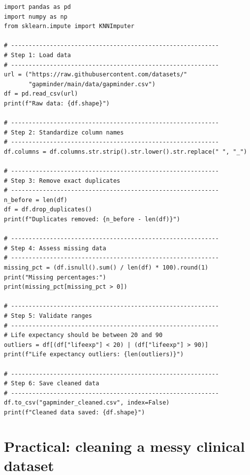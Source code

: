 \begin{verbatim}
import pandas as pd
import numpy as np
from sklearn.impute import KNNImputer

# -----------------------------------------------------------
# Step 1: Load data
# -----------------------------------------------------------
url = ("https://raw.githubusercontent.com/datasets/"
       "gapminder/main/data/gapminder.csv")
df = pd.read_csv(url)
print(f"Raw data: {df.shape}")

# -----------------------------------------------------------
# Step 2: Standardize column names
# -----------------------------------------------------------
df.columns = df.columns.str.strip().str.lower().str.replace(" ", "_")

# -----------------------------------------------------------
# Step 3: Remove exact duplicates
# -----------------------------------------------------------
n_before = len(df)
df = df.drop_duplicates()
print(f"Duplicates removed: {n_before - len(df)}")

# -----------------------------------------------------------
# Step 4: Assess missing data
# -----------------------------------------------------------
missing_pct = (df.isnull().sum() / len(df) * 100).round(1)
print("Missing percentages:")
print(missing_pct[missing_pct > 0])

# -----------------------------------------------------------
# Step 5: Validate ranges
# -----------------------------------------------------------
# Life expectancy should be between 20 and 90
outliers = df[(df["lifeexp"] < 20) | (df["lifeexp"] > 90)]
print(f"Life expectancy outliers: {len(outliers)}")

# -----------------------------------------------------------
# Step 6: Save cleaned data
# -----------------------------------------------------------
df.to_csv("gapminder_cleaned.csv", index=False)
print(f"Cleaned data saved: {df.shape}")
\end{verbatim}

\section{Practical: cleaning a messy clinical dataset}

